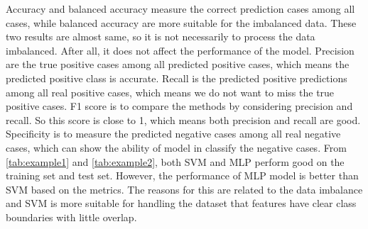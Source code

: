 Accuracy and balanced accuracy measure the correct prediction cases among all cases, while balanced accuracy are more suitable for the imbalanced data. These two results are almost same, so it is not necessarily to process the data imbalanced. After all, it does not affect the performance of the model. 
Precision are the true positive cases among all predicted positive cases, which means the predicted positive class is accurate. 
Recall is the predicted positive predictions among all real positive cases, which means we do not want to miss the true positive cases. 
F1 score is to compare the methods by considering precision and recall. So this score is close to 1, which means both precision and recall are good.   
Specificity is to measure the predicted negative cases among all real negative cases, which can show the ability of model in classify the negative cases. 
From \cref{tab:example1} and \cref{tab:example2}, both SVM and MLP perform good on the training set and test set. However, the performance of MLP model is better than SVM based on the metrics. The reasons for this are related to the data imbalance and SVM is more suitable for handling the dataset that features have clear class boundaries with little overlap.





